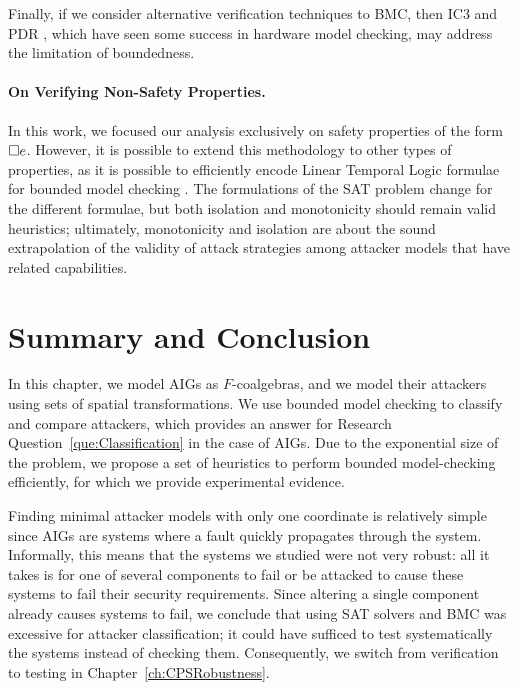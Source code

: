 Finally, if we consider alternative verification techniques to BMC, then IC3 \cite{IC3,IC32} and PDR \cite{IC3}, which have seen some success in hardware model checking, may address the limitation of boundedness.

\paragraph{On Verifying Non-Safety Properties.} In this work, we focused our analysis exclusively on safety properties of the form ${{\square}} e$. However, it is possible to extend this methodology to other types of properties, as it is possible to efficiently encode Linear Temporal Logic formulae for bounded model checking \cite{BMCWithoutBDDs,lmcs:2236}. The formulations of the SAT problem change for the different formulae, but both isolation and monotonicity should remain valid heuristics; ultimately, monotonicity and isolation are about the sound extrapolation of the validity of attack strategies among attacker models that have related capabilities.

\section{Summary and Conclusion}
\label{sec:Classification:Summary}
In this chapter, we model AIGs as $F$-coalgebras, and we model their attackers using sets of spatial transformations. We use bounded model checking to classify and compare attackers, which provides an answer for Research Question~\ref{que:Classification} in the case of AIGs. Due to the exponential size of the problem, we propose a set of heuristics to perform bounded model-checking efficiently, for which we provide experimental evidence. 


Finding minimal attacker models with only one coordinate is relatively simple since AIGs are systems where a fault quickly propagates through the system. Informally, this means that the systems we studied were not very robust: all it takes is for one of several components to fail or be attacked to cause these systems to fail their security requirements. Since altering a single component already causes systems to fail, we conclude that using SAT solvers and BMC was excessive for attacker classification; it could have sufficed to test systematically the systems instead of checking them. Consequently, we switch from verification to testing in Chapter~\ref{ch:CPSRobustness}. 


